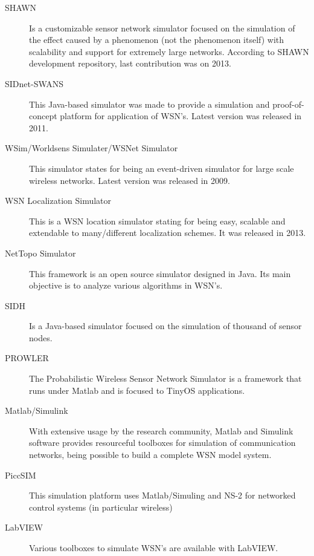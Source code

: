 \begin{description}
	\item [SHAWN]	
	Is a customizable sensor network simulator focused on the simulation of the effect caused by a phenomenon (not the phenomenon itself) with scalability and support for extremely large networks. According to SHAWN development repository, last contribution was on 2013.
		
	\item [SIDnet-SWANS]
	This Java-based simulator was made to provide a simulation and proof-of-concept platform for application of WSN's.
	Latest version was released in 2011.
	
	\item [WSim/Worldsens Simulater/WSNet Simulator]
	This simulator states for being an event-driven simulator for large scale wireless networks. Latest version was released in 2009.

	\item [WSN Localization Simulator]
	This is a WSN location simulator stating for being easy, scalable and extendable to many/different localization schemes. It was released in 2013.
	
	\item [NetTopo Simulator]
	This framework is an open source simulator designed in Java. Its main objective is to analyze various algorithms in WSN's. 
	
	\item [SIDH]
	Is a Java-based simulator focused on the simulation of thousand of sensor nodes.
	
	\item [PROWLER]
	The Probabilistic Wireless Sensor Network Simulator is a framework that runs under Matlab and is focused to TinyOS applications.
	
	\item [Matlab/Simulink]
	With extensive usage by the research community, Matlab and Simulink software provides resourceful toolboxes for simulation of communication networks, being possible to build a complete WSN model system.
	
	\item [PiccSIM]
	This simulation platform uses Matlab/Simuling and NS-2 for networked control systems (in particular wireless)
	
	\item [LabVIEW]
	Various toolboxes to simulate WSN's are available with LabVIEW.
	
\end{description}






